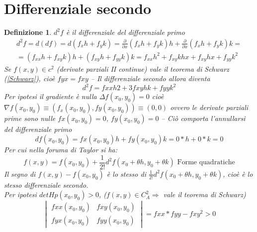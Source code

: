 \documentclass{book}
\newtheorem{defi}{Definizione}
\begin{document}
\section{Differenziale secondo}
\begin{defi}
	$d^2f$ è il differenziale del differenziale primo
        \begin{equation*}
                \begin{matrix}
                        d^2f=d(df)= d(f_xh+f_yk)=\frac{\partial}{\partial x} (f_xh+f_yk)h+ 
                        \frac{\partial}{\partial x}(f_xh+f_yk)k=\\
                        =(f_{xx}h+f_{xy}k)h+ (f_{xy}h+f_{yy}k)k=f_{xx}h^2+f_{xy}k hx+ f_{xy}
                        hx+f_{yy} k^2
                \end{matrix}
         \end{equation*}
         Se $f(x,y)\in c^2$ (derivate parziali II continue) vale il teorema di Schwarz
         (\ref{Schwarz}), cioè $fyx=fxy$ -- Il differenziale secondo allora diventa
         \begin{equation*}
           d^2f=fxxh2+3fxy hk + fyy k^2
         \end{equation*}
         Per ipotesi il gradiente è nulla $\Delta f(x_0,y_0)=0$ cioè $\nabla f(x_0,y_0)\equiv (f_x(x_0,y_0),fy(x_0,y_0))\equiv (0,0)$ ovvero le derivate parziali prime sono nulle
         $fx(x_0,y_0)=0$, $fy(x_0,y_0)=0$ -- Ciò comporta l'annullarsi del differenziale primo
         \begin{equation*}
           df(x_0, y_0)=fx(x_0,y_0)h+fy(x_0,y_0)k=0*h+0*k=0
         \end{equation*}
         Per cui nella foruma di Taylor si ha:
         \begin{equation*}
           f(x,y)=f(x_0,y_0)+\frac{1}{2!}d^2f(x_0+\theta h, y_0+\theta k) \text{ Forme quadratiche}
         \end{equation*}
         Il segno di $f(x,y)-f(x_0,y_0)$ è lo stesso di $\frac{1}{2!}d^2f(x_0+\theta h,
         y_0+\theta k)$, cioè è lo stesso differenziale secondo.\\
         Per ipotesi $det Hp(x_0,y_0)>0$, ($f(x,y)\in C_A^2\Rightarrow$ vale il teorema di Schwarz)
         \begin{equation*}
           \begin{vmatrix}
             fxx(x_0,y_0) & fxy(x_0,y_0) \\
             fyx(x_0,y_0) & fyy(x_0,y_0) 
           \end{vmatrix}= fxx*fyy-fxy^2>0

\end{equation*}
\end{defi}
\end{document}
